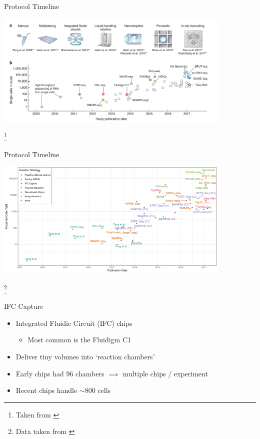 \documentclass[aspectratio=169,11pt]{beamer}
\newcommand\blfootnote[1]{%
  \begingroup
  \renewcommand\thefootnote{}\footnote{#1}%
  \addtocounter{footnote}{-1}%
  \endgroup
}
\begin{document}
\begin{frame}{Protocol Timeline}

	\begin{center}
		\includegraphics[width=0.85\textwidth]{figures/scRNATimeline.jpg} 
	\end{center}

	\blfootnote{Taken from \cite{pmid29494575}}

\end{frame}

\begin{frame}{Protocol Timeline}

	\begin{center}
		\includegraphics[width=0.85\textwidth]{figures/scRNATimeline.pdf} 
	\end{center}

	\blfootnote{Data taken from \cite{pmid29494575}}

\end{frame}

\begin{frame}{IFC Capture}

	\begin{itemize}
		\item Integrated Fluidic Circuit (IFC) chips
		\begin{itemize}
			\item Most common is the Fluidigm C1
		\end{itemize}
		\item Deliver tiny volumes into `reaction chambers'
		\item Early chips had 96 chambers $\implies$ multiple chips / experiment
		\item Recent chips handle $\sim$800 cells
	\end{itemize}

\end{frame}
\end{document}
